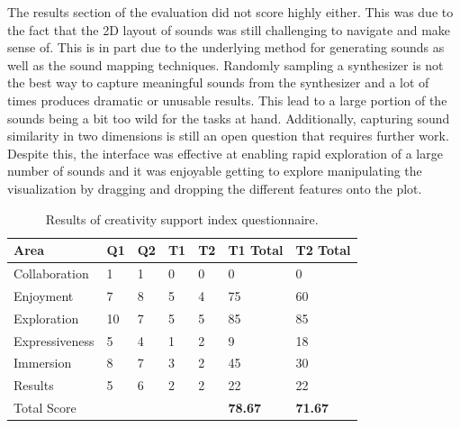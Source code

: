The results section of the evaluation did not score highly either. This was due to the fact that the 2D layout of sounds was still challenging to navigate and make sense of. This is in part due to the underlying method for generating sounds as well as the sound mapping techniques. Randomly sampling a synthesizer is not the best way to capture meaningful sounds from the synthesizer and a lot of times produces dramatic or unusable results. This lead to a large portion of the sounds being a bit too wild for the tasks at hand. Additionally, capturing sound similarity in two dimensions is still an open question that requires further work. Despite this, the interface was effective at enabling rapid exploration of a large number of sounds and it was enjoyable getting to explore manipulating the visualization by dragging and dropping the different features onto the plot.

\begin{table}[th]
\centering
\begin{tabular}{l|llll|ll}
Area           & Q1 & Q2 & T1 & T2 & T1 Total   & T2 Total \\
\hline
Collaboration  & 1  & 1  & 0            & 0            & 0              & 0            \\
Enjoyment      & 7  & 8  & 5            & 4            & 75             & 60           \\
Exploration    & 10 & 7  & 5            & 5            & 85             & 85           \\
Expressiveness & 5  & 4  & 1            & 2            & 9              & 18           \\
Immersion      & 8  & 7  & 3            & 2            & 45             & 30           \\
Results        & 5  & 6  & 2            & 2            & 22             & 22           \\
Total Score    &    &    &              &              & \textbf{78.67} & \textbf{71.67} 
\end{tabular}
\caption{Results of creativity support index questionnaire.}
\label{table:csi}
\end{table}

